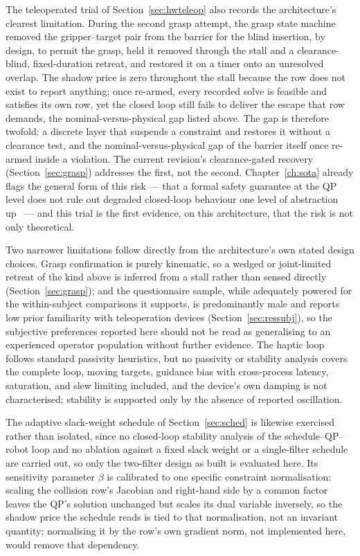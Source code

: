 The teleoperated trial of Section~\ref{sec:hwteleop} also records the architecture's clearest limitation. During the second grasp attempt, the grasp state machine removed the gripper--target pair from the barrier for the blind insertion, by design, to permit the grasp, held it removed through the stall and a clearance-blind, fixed-duration retreat, and restored it on a timer onto an unresolved overlap. The shadow price is zero throughout the stall because the row does not exist to report anything; once re-armed, every recorded solve is feasible and satisfies its own row, yet the closed loop still fails to deliver the escape that row demands, the nominal-versus-physical gap listed above. The gap is therefore twofold: a discrete layer that suspends a constraint and restores it without a clearance test, and the nominal-versus-physical gap of the barrier itself once re-armed inside a violation. The current revision's clearance-gated recovery (Section~\ref{sec:grasp}) addresses the first, not the second. Chapter~\ref{ch:sota} already flags the general form of this risk --- that a formal safety guarantee at the QP level does not rule out degraded closed-loop behaviour one level of abstraction up~\cite{reis2021undesirable} --- and this trial is the first evidence, on this architecture, that the risk is not only theoretical.

Two narrower limitations follow directly from the architecture's own stated design choices. Grasp confirmation is purely kinematic, so a wedged or joint-limited retreat of the kind above is inferred from a stall rather than sensed directly (Section~\ref{sec:grasp}); and the questionnaire sample, while adequately powered for the within-subject comparisons it supports, is predominantly male and reports low prior familiarity with teleoperation devices (Section~\ref{sec:ressubj}), so the subjective preferences reported here should not be read as generalising to an experienced operator population without further evidence. The haptic loop follows standard passivity heuristics, but no passivity or stability analysis covers the complete loop, moving targets, guidance bias with cross-process latency, saturation, and slew limiting included, and the device's own damping is not characterised; stability is supported only by the absence of reported oscillation.

The adaptive slack-weight schedule of Section~\ref{sec:sched} is likewise exercised rather than isolated, since no closed-loop stability analysis of the schedule--QP--robot loop and no ablation against a fixed slack weight or a single-filter schedule are carried out, so only the two-filter design as built is evaluated here. Its sensitivity parameter $\beta$ is calibrated to one specific constraint normalisation: scaling the collision row's Jacobian and right-hand side by a common factor leaves the QP's solution unchanged but scales its dual variable inversely, so the shadow price the schedule reads is tied to that normalisation, not an invariant quantity; normalising it by the row's own gradient norm, not implemented here, would remove that dependency.

